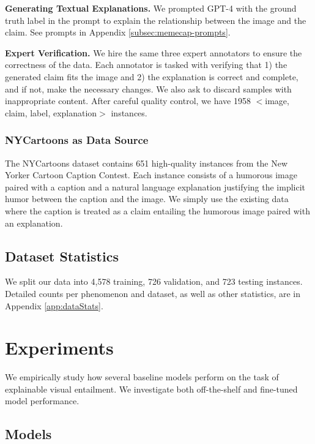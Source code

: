 {\bf Generating Textual Explanations.} We prompted GPT-4 with the ground truth label in the prompt to explain the relationship between the image and the claim. See prompts in Appendix \ref{subsec:memecap-prompts}.

{\bf Expert Verification.} We hire the same three expert annotators to ensure the correctness of the data. Each annotator is tasked with verifying that 1) the generated claim fits the image and 2) the explanation is correct and complete, and if not, make the necessary changes. We also ask to discard samples with inappropriate content.  
After careful quality control, we have 1958 $<$image, claim, label, explanation$>$ instances.

\subsubsection{NYCartoons as Data Source} The NYCartoons dataset \cite{hessel-etal-2023-androids} contains 651 high-quality instances from the New Yorker Cartoon Caption Contest. Each instance consists of a humorous image paired with a caption and a natural language explanation justifying the implicit humor between the caption and the image. We simply use the existing data where the caption is treated as a claim entailing the humorous image paired with an explanation.

\subsection{Dataset Statistics}
We split our data into 4,578 training, 726 validation, and 723 testing instances. Detailed counts per phenomenon and dataset, as well as other statistics, are in Appendix \ref{app:dataStats}. 


\section{Experiments}

We empirically study how several baseline models perform on the task of explainable visual entailment. We investigate both off-the-shelf and fine-tuned model performance.

\subsection{Models}

